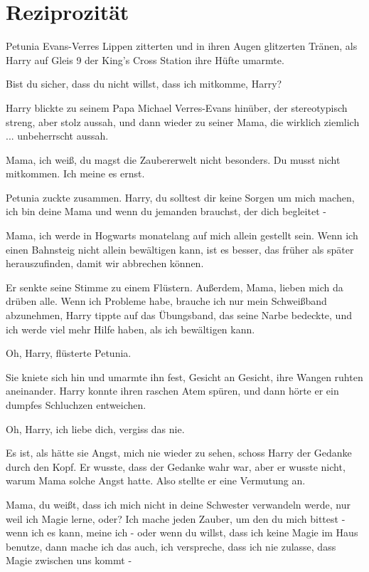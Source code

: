 \chapter{Reziprozität}

Petunia Evans-Verres Lippen zitterten und in ihren Augen glitzerten
Tränen, als Harry auf Gleis 9 der King's Cross Station ihre Hüfte umarmte.

\glqq{}Bist du sicher, dass du nicht willst, dass ich mitkomme, Harry?\grqq{}

Harry blickte zu seinem Papa Michael Verres-Evans hinüber, der stereotypisch
streng, aber stolz aussah, und dann wieder zu seiner Mama, die wirklich
ziemlich ... unbeherrscht aussah.

\glqq{}Mama, ich weiß, du magst die Zaubererwelt nicht besonders. Du musst nicht
mitkommen. Ich meine es ernst.\grqq{}

Petunia zuckte zusammen. \glqq{}Harry, du solltest dir keine Sorgen um mich
machen, ich bin deine Mama und wenn du jemanden brauchst, der dich begleitet
-\grqq{}

\glqq{}Mama, ich werde in Hogwarts monatelang auf mich allein gestellt sein. Wenn
ich einen Bahnsteig nicht allein bewältigen kann, ist es besser, das früher als
später herauszufinden, damit wir abbrechen können.\grqq{}

Er senkte seine Stimme zu einem Flüstern. \glqq{}Außerdem, Mama, lieben mich da
drüben alle. Wenn ich Probleme habe, brauche ich nur mein Schweißband
abzunehmen\grqq{}, Harry tippte auf das Übungsband, das seine Narbe bedeckte,
\glqq{}und ich werde viel mehr Hilfe haben, als ich bewältigen kann.\grqq{}

\glqq{}Oh, Harry\grqq{}, flüsterte Petunia.

Sie kniete sich hin und umarmte ihn fest, Gesicht an Gesicht, ihre Wangen ruhten
aneinander. Harry konnte ihren raschen Atem spüren, und dann hörte er ein
dumpfes Schluchzen entweichen.

\glqq{}Oh, Harry, ich liebe dich, vergiss das nie.\grqq{}

Es ist, als hätte sie Angst, mich nie wieder zu sehen, schoss Harry der Gedanke
durch den Kopf. Er wusste, dass der Gedanke wahr war, aber er wusste nicht,
warum Mama solche Angst hatte. Also stellte er eine Vermutung an.

\glqq{}Mama, du weißt, dass ich mich nicht in deine Schwester verwandeln werde,
nur weil ich Magie lerne, oder? Ich mache jeden Zauber, um den du mich bittest -
wenn ich es kann, meine ich - oder wenn du willst, dass ich keine Magie im Haus
benutze, dann mache ich das auch, ich verspreche, dass ich nie zulasse, dass
Magie zwischen uns kommt -\grqq{}

